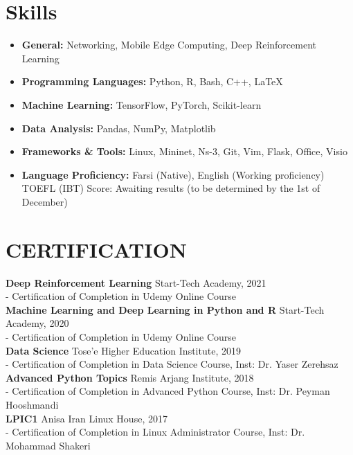 \documentclass[11pt]{article}
\begin{document}
\section{Skills}



\begin{itemize}[noitemsep,topsep=0pt,parsep=0pt,partopsep=0pt]
	\item {\textbf{General:} Networking, Mobile Edge Computing, Deep Reinforcement Learning}\vspace{1mm}
	\item {\textbf{Programming Languages:} Python, R, Bash, C++, \LaTeX}\vspace{1mm}
	\item {\textbf{Machine Learning:} TensorFlow, PyTorch, Scikit-learn}\vspace{1mm}
	\item {\textbf{Data Analysis:} Pandas, NumPy, Matplotlib}\vspace{1mm}
	\item {\textbf{Frameworks \& Tools:} Linux, Mininet, Ns-3, Git, Vim, Flask, Office, Visio}\vspace{1mm}
	\item {\textbf{Language Proficiency:} Farsi (Native), English (Working proficiency)}\vspace{1mm}\\
    TOEFL (IBT) Score: Awaiting results (to be determined by the 1st of December)

\end{itemize}


\section{CERTIFICATION}

\textbf{Deep Reinforcement Learning}  \hfill Start-Tech Academy, 2021\\
- Certification of Completion in Udemy Online Course\\
\textbf{Machine Learning and Deep Learning in Python and R}  \hfill Start-Tech Academy, 2020\\
- Certification of Completion in Udemy Online Course\\
\textbf{Data Science} \hfill Tose’e Higher Education Institute, 2019\\
- Certification of Completion in Data Science Course, Inst: Dr. Yaser Zerehsaz\\
\textbf{Advanced Python Topics} \hfill Remis Arjang Institute, 2018\\
- Certification of Completion in Advanced Python Course, Inst: Dr. Peyman Hooshmandi\\
\textbf{LPIC1} \hfill Anisa Iran Linux House, 2017\\
- Certification of Completion in Linux Administrator Course, Inst: Dr. Mohammad Shakeri 
\end{document}
